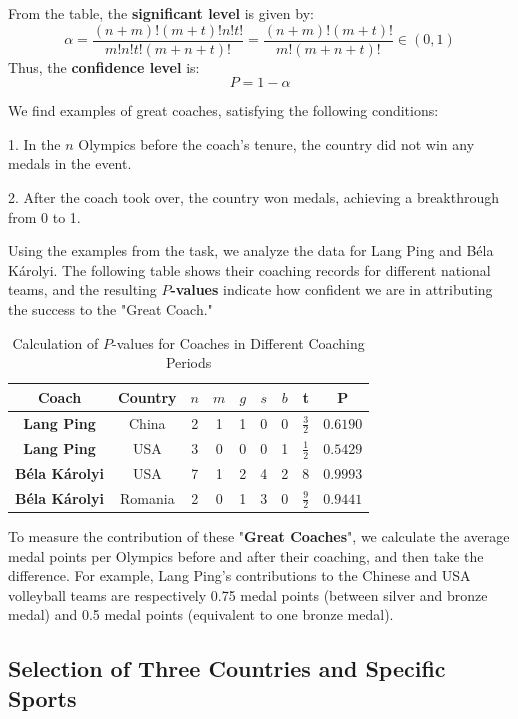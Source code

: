 \documentclass{mcmthesis}  %
\begin{document}
From the table, the \textbf{significant level} is given by:
$$
\alpha = \frac{(n+m)!(m+t)!n!t!}{m!n!t!(m+n+t)!} = \frac{(n+m)!(m+t)!}{m!(m+n+t)!} \in (0,1)
$$
Thus, the \textbf{confidence level} is:
$$
P = 1 - \alpha
$$

We find examples of great coaches, satisfying the following conditions:

1. In the \(n\) Olympics before the coach’s tenure, the country did not win any medals in the event.

2. After the coach took over, the country won medals, achieving a breakthrough from 0 to 1.

Using the examples from the task, we analyze the data for Lang Ping and Béla Károlyi. The following table shows their coaching records for different national teams, and the resulting\textbf{ \(P\)-values} indicate how confident we are in attributing the success to the "Great Coach."

\begin{table}[h!]
\centering
\begin{tabular}{|c|c|c|c|c|c|c|c|c|}
\hline
\textbf{Coach} & \textbf{Country} & \( n \) & \( m \) & \( g \) & \( s \) & \( b \) & t & P \\ \hline
\textbf{Lang Ping} & China & 2 & 1 & 1 & 0 & 0 & \( \frac{3}{2} \) & \( 0.6190 \) \\ \hline
\textbf{Lang Ping} & USA & 3 & 0 & 0 & 0 & 1 & \( \frac{1}{2} \) & \( 0.5429 \) \\ \hline
\textbf{Béla Károlyi} & USA & 7 & 1 & 2 & 4 & 2 & \( 8 \) & \( 0.9993 \) \\ \hline
\textbf{Béla Károlyi} & Romania & 2 & 0 & 1 & 3 & 0 & \( \frac{9}{2} \) & \( 0.9441 \) \\ \hline
\end{tabular}
\caption{Calculation of \( P \)-values for Coaches in Different Coaching Periods}
\end{table}

To measure the contribution of these "\textbf{Great Coaches}", we calculate the average medal points per Olympics before and after their coaching, and then take the difference. For example, Lang Ping's contributions to the Chinese and USA volleyball teams are respectively 0.75 medal points (between silver and bronze medal) and 0.5 medal points (equivalent to one bronze medal).


\subsection{Selection of Three Countries and Specific Sports}
\end{document}
